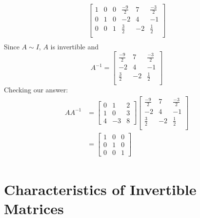 \documentclass[12pt letter]{report}
\begin{document}
{{\begin{align*}
      \begin{bmatrix}
        1 & 0 & 0 & \frac{-9}{2} & 7  & \frac{-3}{2} \\
        0 & 1 & 0 & -2           & 4  & -1           \\
        0 & 0 & 1 & \frac{3}{2}  & -2 & \frac{1}{2}  \\
      \end{bmatrix}
      \\
    \end{align*}
    Since $A \sim I$, $A$ is invertible and
    \[
      A^{-1}= \begin{bmatrix}
        \frac{-9}{2} & 7  & \frac{-3}{2} \\
        -2           & 4  & -1           \\
        \frac{3}{2}  & -2 & \frac{1}{2}  \\
      \end{bmatrix}
    \]
    Checking our answer:
    \begin{align*}
      A A^{-1} & = \begin{bmatrix}
                     0 & 1  & 2 \\
                     1 & 0  & 3 \\
                     4 & -3 & 8
                   \end{bmatrix} \begin{bmatrix}
                                   \frac{-9}{2} & 7  & \frac{-3}{2} \\
                                   -2           & 4  & -1           \\
                                   \frac{3}{2}  & -2 & \frac{1}{2}  \\
                                 \end{bmatrix} \\
               & = \begin{bmatrix}
                     1 & 0 & 0 \\
                     0 & 1 & 0 \\
                     0 & 0 & 1
                   \end{bmatrix}                                 \\
    \end{align*}
  }

}

\section{Characteristics of Invertible Matrices}
\end{document}
